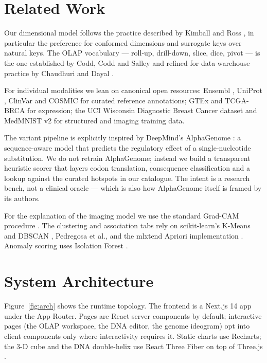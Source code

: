 \documentclass[conference,10pt]{IEEEtran}
\begin{document}
\section{Related Work}
Our dimensional model follows the practice described by Kimball and Ross
\cite{kimball2013}, in particular the preference for conformed dimensions
and surrogate keys over natural keys. The OLAP vocabulary --- roll-up,
drill-down, slice, dice, pivot --- is the one established by Codd,
Codd and Salley \cite{codd1993} and refined for data warehouse practice
by Chaudhuri and Dayal \cite{chaudhuri1997}.

For individual modalities we lean on canonical open resources: Ensembl
\cite{ensembl2024}, UniProt \cite{uniprot2023}, ClinVar \cite{clinvar2024}
and COSMIC \cite{cosmic2019} for curated reference annotations; GTEx
\cite{gtex2020} and TCGA-BRCA \cite{tcga2012} for expression; the UCI
Wisconsin Diagnostic Breast Cancer dataset \cite{wdbc1995} and MedMNIST
v2 \cite{medmnist2023} for structured and imaging training data.

The variant pipeline is explicitly inspired by DeepMind's AlphaGenome
\cite{alphagenome2024}: a sequence-aware model that predicts the regulatory
effect of a single-nucleotide substitution. We do not retrain
AlphaGenome; instead we build a transparent heuristic scorer that
layers codon translation, consequence classification and a lookup
against the curated hotspots in our catalogue. The intent is a research
bench, not a clinical oracle --- which is also how AlphaGenome itself is
framed by its authors.

For the explanation of the imaging model we use the standard Grad-CAM
procedure \cite{selvaraju2017}. The clustering and association tabs rely
on scikit-learn's K-Means and DBSCAN \cite{sklearn2011}, Pedregosa et al.,
and the mlxtend Apriori implementation \cite{mlxtend2018}. Anomaly scoring
uses Isolation Forest \cite{liu2008}.

\section{System Architecture}
Figure~\ref{fig:arch} shows the runtime topology. The frontend is a
Next.js 14 app under the App Router. Pages are React server components
by default; interactive pages (the OLAP workspace, the DNA editor, the
genome ideogram) opt into client components only where interactivity
requires it. Static charts use Recharts; the 3-D cube and the DNA
double-helix use React Three Fiber on top of Three.js
\cite{threejs2024}.
\end{document}
